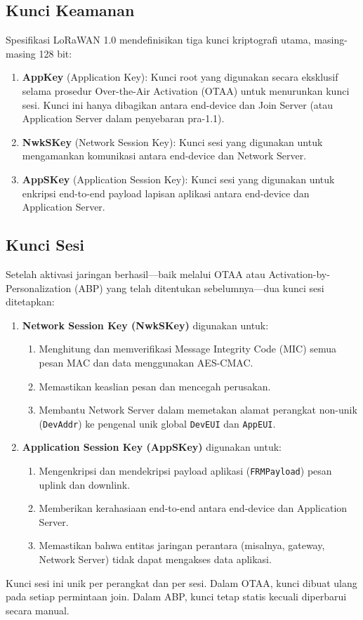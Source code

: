 \subsection{Kunci Keamanan}
Spesifikasi LoRaWAN 1.0 mendefinisikan tiga kunci kriptografi utama, masing-masing 128 bit:
\begin{enumerate}
    \item \textbf{AppKey} (Application Key): Kunci root yang digunakan secara eksklusif selama prosedur Over-the-Air Activation (OTAA) untuk menurunkan kunci sesi. Kunci ini hanya dibagikan antara end-device dan Join Server (atau Application Server dalam penyebaran pra-1.1).
    \item \textbf{NwkSKey} (Network Session Key): Kunci sesi yang digunakan untuk mengamankan komunikasi antara end-device dan Network Server.
    \item \textbf{AppSKey} (Application Session Key): Kunci sesi yang digunakan untuk enkripsi end-to-end payload lapisan aplikasi antara end-device dan Application Server.
\end{enumerate}
\subsection{Kunci Sesi}
Setelah aktivasi jaringan berhasil—baik melalui OTAA atau Activation-by-Personalization (ABP) yang telah ditentukan sebelumnya—dua kunci sesi ditetapkan:
\begin{enumerate}
    \item \textbf{Network Session Key (NwkSKey)} digunakan untuk:
          \begin{enumerate}
              \item Menghitung dan memverifikasi Message Integrity Code (MIC) semua pesan MAC dan data menggunakan AES-CMAC.
              \item Memastikan keaslian pesan dan mencegah perusakan.
              \item Membantu Network Server dalam memetakan alamat perangkat non-unik (\texttt{DevAddr}) ke pengenal unik global \texttt{DevEUI} dan \texttt{AppEUI}.
          \end{enumerate}
    \item \textbf{Application Session Key (AppSKey)} digunakan untuk:
          \begin{enumerate}
              \item Mengenkripsi dan mendekripsi payload aplikasi (\texttt{FRMPayload}) pesan uplink dan downlink.
              \item Memberikan kerahasiaan end-to-end antara end-device dan Application Server.
              \item Memastikan bahwa entitas jaringan perantara (misalnya, gateway, Network Server) tidak dapat mengakses data aplikasi.
          \end{enumerate}
\end{enumerate}
Kunci sesi ini unik per perangkat dan per sesi. Dalam OTAA, kunci dibuat ulang pada setiap permintaan join. Dalam ABP, kunci tetap statis kecuali diperbarui secara manual.
